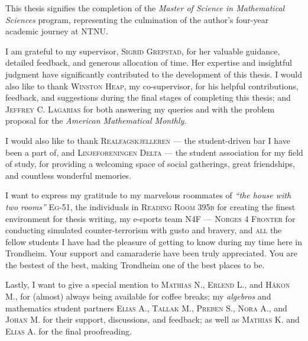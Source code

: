 




\vspace{.25in}

This thesis signifies the completion of the \textit{Master of Science in Mathematical Sciences} program, representing the culmination of the author's four-year academic journey at NTNU.

I am grateful to my supervisor, \textsc{Sigrid Grepstad}, for her valuable guidance, detailed feedback, and generous allocation of time. Her expertise and insightful judgment have significantly contributed to the development of this thesis. I would also like to thank \textsc{Winston Heap}, my co-supervisor, for his helpful contributions, feedback, and suggestions during the final stages of completing this thesis; and \textsc{Jeffrey C. Lagarias} for both answering my queries and with the problem proposal for the \emph{American Mathematical Monthly}.   

I would also like to thank \textsc{Realfagskjelleren} — the student-driven bar I have been a part of, and \textsc{Linjeforeningen Delta} — the student association for my field of study, for providing a welcoming space of social gatherings, great friendships, and countless wonderful memories. 

I want to express my gratitude to my marvelous roommates of \emph{\enquote{the house with two rooms}} \textsc{Eg-51}, the individuals in \textsc{Reading Room 395b} for creating the finest environment for thesis writing, my e-sports team \textsc{N4F — Norges 4 Fronter} for conducting simulated counter-terrorism with gusto and bravery, and \textsc{all} the fellow students I have had the pleasure of getting to know during my time here in Trondheim. Your support and camaraderie have been truly appreciated. You are the bestest of the best, making Trondheim one of the best places to be. 

Lastly, I want to give a special mention to \textsc{Mathias N.}, \textsc{Erlend L.}, and \textsc{Håkon M.}, for (almost) always being available for coffee breaks; my \emph{algebros} and mathematics student partners \textsc{Elias A.}, \textsc{Tallak M.}, \textsc{Preben S.}, \textsc{Nora A.}, and \textsc{Johan M.} for their support, discussions, and feedback; as well as \textsc{Mathias K.} and \textsc{Elias A.} for the final proofreading.



